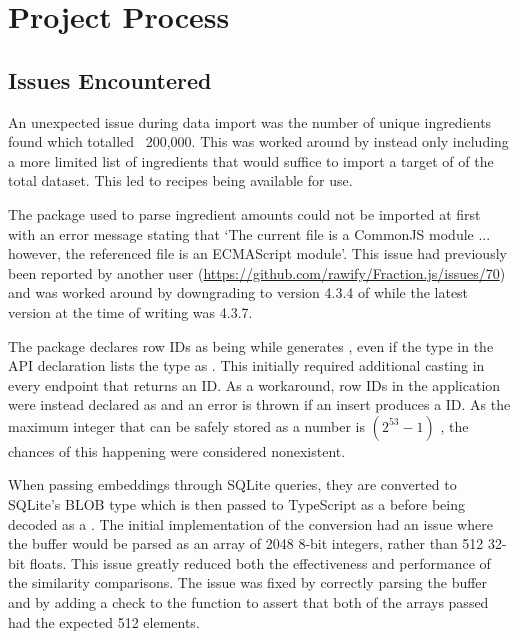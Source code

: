 \section{Project Process}

\subsection{Issues Encountered}

An unexpected issue during data import was the number of unique ingredients found which totalled ~200,000. This was worked
around by instead only including a more limited list of ingredients that would suffice to import a target of  of
the total dataset. This led to  recipes being available for use.

The  package used to parse ingredient amounts could not be imported at first with an error message
stating that \enquote*{The current file is a CommonJS module ... however, the referenced file is an ECMAScript module}.
This issue had previously been reported by another user (\href{https://github.com/rawify/Fraction.js/issues/70}{https://github.com/rawify/Fraction.js/issues/70})
and was worked around by downgrading to version 4.3.4 of  while the latest version at the time
of writing was 4.3.7.

The  package declares row IDs as being 
while  generates , even if the type in the API
declaration lists the type as . This initially required additional casting in every endpoint
that returns an ID. As a workaround, row IDs in the application were instead declared as 
and an error is thrown if an insert produces a  ID. As the maximum integer that can be safely stored as a number is
$(2^{53} - 1)$ , the chances of this happening were considered nonexistent.

When passing embeddings through SQLite queries, they are converted to SQLite's BLOB type which is then passed to TypeScript as a 
before being decoded as a .
The initial implementation of the conversion had an issue where the buffer would be parsed as an array of 2048 8-bit integers,
rather than 512 32-bit floats. This issue greatly reduced both the effectiveness and performance of the similarity comparisons.
The issue was fixed by correctly parsing the buffer and by adding a check to the  function to assert
that both of the arrays passed had the expected 512 elements.

